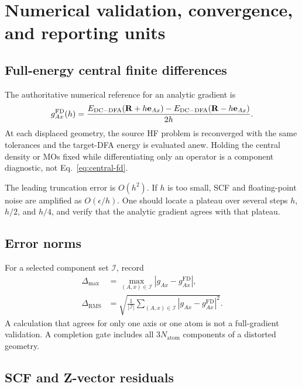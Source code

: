 \section{Numerical validation, convergence, and reporting units}
\label{sec:validation}

\subsection{Full-energy central finite differences}

The authoritative numerical reference for an analytic gradient is
\begin{equation}
  g_{Ax}^{\mathrm{FD}}(h)
  =\frac{E_{\mathrm{DC-DFA}}(\mathbf{R}+h\mathbf e_{Ax})
         -E_{\mathrm{DC-DFA}}(\mathbf{R}-h\mathbf e_{Ax})}{2h}.
  \label{eq:central-fd}
\end{equation}
At each displaced geometry, the source HF problem is reconverged with the same
tolerances and the target-DFA energy is evaluated anew.  Holding the central
density or MOs fixed while differentiating only an operator is a component
diagnostic, not Eq.~\eqref{eq:central-fd}.

The leading truncation error is $O(h^2)$.  If $h$ is too small, SCF and
floating-point noise are amplified as $O(\epsilon/h)$.  One should locate a
plateau over several steps $h$, $h/2$, and $h/4$, and verify that the analytic
gradient agrees with that plateau.

\subsection{Error norms}

For a selected component set $\mathcal I$, record
\begin{align}
  \Delta_{\max}
  &=\max_{(A,x)\in\mathcal I}|g_{Ax}-g_{Ax}^{\mathrm{FD}}|,
  \label{eq:fd-max-error}\\
  \Delta_{\mathrm{RMS}}
  &=\sqrt{\frac1{|\mathcal I|}\sum_{(A,x)\in\mathcal I}
          |g_{Ax}-g_{Ax}^{\mathrm{FD}}|^2}.
  \label{eq:fd-rms-error}
\end{align}
A calculation that agrees for only one axis or one atom is not a full-gradient
validation.  A completion gate includes all $3N_{\mathrm{atom}}$ components of
a distorted geometry.

\subsection{SCF and Z-vector residuals}

